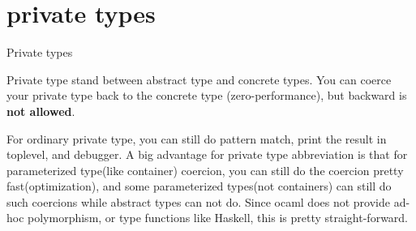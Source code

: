 \section{private types}
\label{sec:fancy-types-1}


Private types 

Private type stand between abstract type and concrete types. You can
coerce your private type back to the concrete type (zero-performance),
but backward is \textbf{not allowed}.

For ordinary private type, you can still do pattern match, print the
result in toplevel, and debugger. A big advantage for private type
abbreviation is that for parameterized type(like container) coercion,
you can still do the coercion pretty fast(optimization), and some
parameterized types(not containers) can still do such coercions while
abstract types can not do. Since ocaml does not provide ad-hoc
polymorphism, or type functions like Haskell, this is pretty
straight-forward.

\inputminted[fontsize=\scriptsize, ]{ocaml}{./lang/code/priv.ml}

